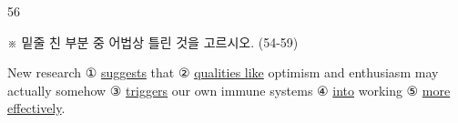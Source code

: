 \begin{question}{56}
\begin{framedtext}
※ 밑줄 친 부분 중 어법상 틀린 것을 고르시오. (54-59) \par
\end{framedtext}
New research ① \uline{suggests} that ② \uline{qualities like} optimism and enthusiasm may actually somehow ③ \uline{triggers} our own immune systems ④ \uline{into} working ⑤  \uline{more effectively}.
\end{question}
